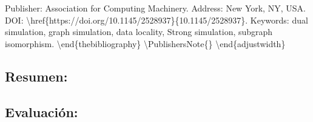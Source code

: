 \documentclass{article}%
\begin{document}
Publisher: Association for Computing Machinery.\newline%
Address: New York, NY, USA.\newline%
DOI: \textbackslash{}href\{https://doi.org/10.1145/2528937\}\{10.1145/2528937\}.\newline%
Keywords: dual simulation, graph simulation, data locality, Strong simulation, subgraph isomorphism.\newline%
\newline%
\textbackslash{}end\{thebibliography\}\newline%
\newline%
\textbackslash{}PublishersNote\{\}\newline%
\textbackslash{}end\{adjustwidth\}

%
\subsection{Resumen:}%
\label{subsec:Resumen}%

%
\subsection{Evaluación:}%
\label{subsec:Evaluacin}%

%
\end{document}
